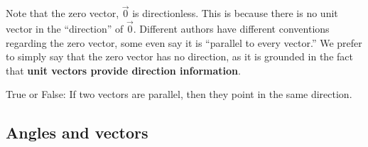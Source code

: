\documentclass{ximera}
\begin{document}
Note that the zero vector, $\vec 0$ is directionless. This is because
there is no unit vector in the ``direction'' of $\vec 0$. Different
authors have different conventions regarding the zero vector, some
even say it is ``parallel to every vector.'' We prefer to simply say
that the zero vector has no direction, as it is grounded in the fact
that \textbf{unit vectors provide direction information}.

\begin{question}
  True or False: If two vectors are parallel, then they point in the same direction.
  \begin{prompt}
    \begin{multipleChoice}
    \end{multipleChoice}
  \end{prompt}
\end{question}




\subsection{Angles and vectors}
\end{document}
